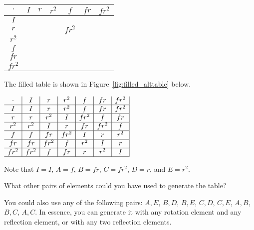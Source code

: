 \documentclass[../gatm_answers.tex]{subfiles}
\begin{document}
\begin{center}
\begin{tabular}{c|c|c|c|c|c|c|}
$\cdot$ & $I$ & $r$ & $r^2$ & $f$ & $fr$ & $fr^2$ \\ \hline
$I$    &   &   &   &   &   &   \\ \hline
$r$    &   &   &   & $fr^2$  &   &   \\ \hline
$r^2$    &   &   &   &   &   &   \\ \hline
$f$    &   &   &   &   &   &   \\ \hline
$fr$    &   &   &   &   &   &   \\ \hline
$fr^2$    &   &   &   &   &   &   \\ \hline
\end{tabular}
\label{fig:alttable}
\end{center}

The filled table is shown in Figure~\ref{fig:filled_alttable} below.
\begin{center}
$\begin{array}{c|c|c|c|c|c|c|}
\cdot & I & r & r^2 & f & fr & fr^2 \\ \hline
I & I & r & r^2 & f & fr & fr^2 \\ \hline
r & r & r^2 & I & fr^2 & f & fr \\ \hline
r^2 & r^2 & I & r & fr & fr^2 & f \\ \hline
f & f & fr & fr^2 & I & r & r^2 \\ \hline
fr & fr & fr^2 & f & r^2 & I & r \\ \hline
fr^2 & fr^2 & f & fr & r & r^2 & I \\ \hline
\end{array}$
\label{fig:filled_alttable}
\end{center}

Note that $I=I$, $A=f$, $B=fr$, $C=fr^2$, $D=r$, and $E=r^2$.

\begin{outer_problem}
\item What other pairs of elements could you have used to generate the table?
\end{outer_problem}

You could also use any of the following pairs: ${A,E}$, ${B,D}$, ${B,E}$, ${C,D}$, ${C,E}$, ${A,B}$, ${B,C}$, ${A,C}$. In essence, you can generate it with any rotation element and any reflection element, or with any two reflection elements.
\end{document}
